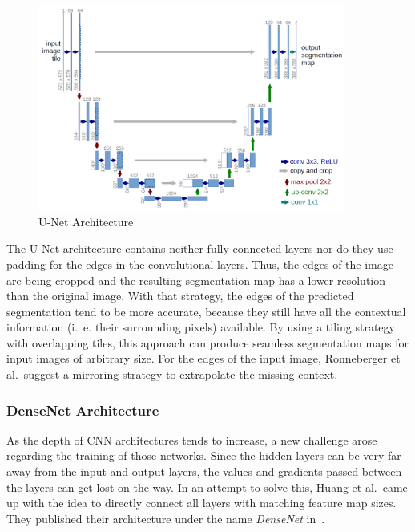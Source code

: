 \begin{figure}[h]
    \centering
    \includegraphics[width=0.9\textwidth]{images/u-net-architecture}
    \caption{U-Net Architecture \cite{unet15}}
    \label{fig:unet_architecture}
\end{figure}

The U-Net architecture contains neither fully connected layers nor do they use padding for the edges in the convolutional layers. Thus, the edges of the image are being cropped and the resulting segmentation map has a lower resolution than the original image. With that strategy, the edges of the predicted segmentation tend to be more accurate, because they still have all the contextual information (i.~e. their surrounding pixels) available. By using a tiling strategy with overlapping tiles, this approach can produce seamless segmentation maps for input images of arbitrary size. For the edges of the input image, Ronneberger et al.\ suggest a mirroring strategy to extrapolate the missing context.~\cite{unet15}

\subsubsection{DenseNet Architecture}
\label{sec:densenet}
As the depth of CNN architectures tends to increase, a new challenge arose regarding the training of those networks. Since the hidden layers can be very far away from the input and output layers, the values and gradients passed between the layers can get lost on the way. In an attempt to solve this, Huang et al.\ came up with the idea to directly connect all layers with matching feature map sizes. They published their architecture under the name \emph{DenseNet} in~\cite{densenet18}.


